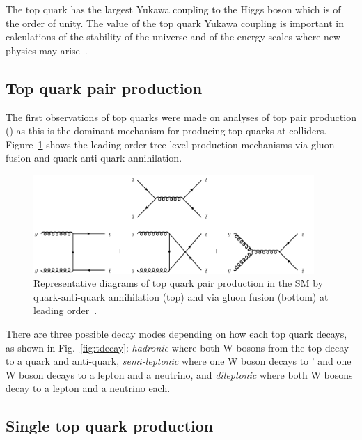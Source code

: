 The top quark has the largest Yukawa coupling to the Higgs boson which is of the order of unity. The value of the top quark Yukawa coupling is important in calculations of the stability of the universe and of the energy scales where new physics may arise~\cite{Bezrukov:2014ina}.

\subsection{Top quark pair production}

The first observations of top quarks were made on analyses of top pair production (\ttbar) as this is the dominant mechanism for producing top quarks at colliders. Figure~\ref{fig:ttproduction} shows the leading order tree-level production mechanisms via gluon fusion and quark-anti-quark annihilation. 

\begin{figure}[ht!]
\begin{center}
    \includegraphics[width=0.95\textwidth]{images/Theory/ttbarfeynman.png}
    \caption{Representative diagrams of top quark pair production in the SM by quark-anti-quark annihilation (top) and via gluon fusion (bottom) at leading order~\cite{Kohn:2012ksa}.}
    \label{fig:ttproduction}
\end{center}
\end{figure}

There are three possible decay modes depending on how each top quark decays, as shown in Fig.~\ref{fig:tdecay}: \emph{hadronic} where both W bosons from the top decay to a quark and anti-quark, \emph{semi-leptonic} where one W boson decays to \qqbar' and one W boson decays to a lepton and a neutrino, and \emph{dileptonic} where both W bosons decay to a lepton and a neutrino each.


\subsection{Single top quark production}

